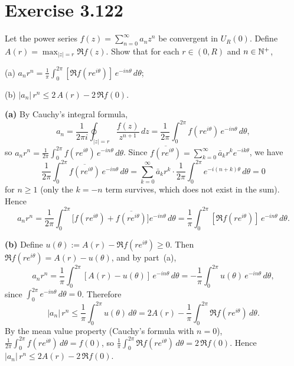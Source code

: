 \documentclass{article}
\begin{document}
\section{Exercise 3.122}

Let the power series $f(z) = \sum_{n=0}^{\infty} a_n z^n$
be convergent in $U_R(0)$.
Define $A(r) = \max_{|z|=r} \Re f(z)$.
Show that for each $r \in (0, R)$ and $n \in \mathbb{N}^+$,

(a) $\displaystyle a_n r^n
= \frac{1}{\pi}\int_0^{2\pi}
[\Re f(r e^{i\theta})]\,e^{-in\theta}\,d\theta$;

(b) $|a_n|\,r^n \le 2\,A(r) - 2\,\Re f(0)$.

\begin{solution}
  \textbf{(a)}\;
  By Cauchy's integral formula,
  \[
    a_n = \frac{1}{2\pi i}\oint_{|z|=r}
    \frac{f(z)}{z^{n+1}}\,dz
    = \frac{1}{2\pi}\int_0^{2\pi} f(re^{i\theta})\,e^{-in\theta}\,d\theta,
  \]
  so $a_n r^n = \frac{1}{2\pi}\int_0^{2\pi}
  f(re^{i\theta})\,e^{-in\theta}\,d\theta$.
  Since $\overline{f(re^{i\theta})} = \sum_{k=0}^{\infty}
  \bar{a}_k r^k e^{-ik\theta}$, we have
  \[
    \frac{1}{2\pi}\int_0^{2\pi}
    \overline{f(re^{i\theta})}\,e^{-in\theta}\,d\theta
    = \sum_{k=0}^{\infty}\bar{a}_k r^k
    \cdot\frac{1}{2\pi}\int_0^{2\pi}e^{-i(n+k)\theta}\,d\theta = 0
  \]
  for $n \ge 1$ (only the $k = -n$ term survives, which does not
  exist in the sum).
  Hence
  \[
    a_n r^n
    = \frac{1}{2\pi}\int_0^{2\pi}
    \bigl[f(re^{i\theta})
    + \overline{f(re^{i\theta})}\bigr]e^{-in\theta}\,d\theta
    = \frac{1}{\pi}\int_0^{2\pi}
    [\Re f(re^{i\theta})]\,e^{-in\theta}\,d\theta.
  \]

  \medskip

  \textbf{(b)}\;
  Define $u(\theta) := A(r) - \Re f(re^{i\theta}) \ge 0$.
  Then $\Re f(re^{i\theta}) = A(r) - u(\theta)$, and by part~(a),
  \[
    a_n r^n
    = \frac{1}{\pi}\int_0^{2\pi}[A(r)-u(\theta)]\,e^{-in\theta}\,d\theta
    = -\frac{1}{\pi}\int_0^{2\pi}u(\theta)\,e^{-in\theta}\,d\theta,
  \]
  since $\int_0^{2\pi}e^{-in\theta}\,d\theta = 0$.
  Therefore
  \[
    |a_n|\,r^n
    \le \frac{1}{\pi}\int_0^{2\pi}u(\theta)\,d\theta
    = 2A(r) - \frac{1}{\pi}\int_0^{2\pi}\Re f(re^{i\theta})\,d\theta.
  \]
  By the mean value property (Cauchy's formula with $n = 0$),
  $\frac{1}{2\pi}\int_0^{2\pi}f(re^{i\theta})\,d\theta = f(0)$,
  so $\frac{1}{\pi}\int_0^{2\pi}\Re f(re^{i\theta})\,d\theta
  = 2\,\Re f(0)$.
  Hence $|a_n|\,r^n \le 2A(r) - 2\,\Re f(0)$.\qedhere
\end{solution}
\end{document}
